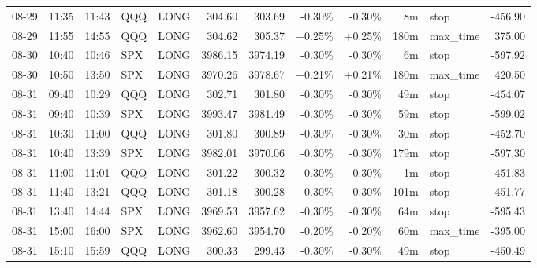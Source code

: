 \documentclass[11pt,a4paper]{article}
\begin{document}
\begin{center}
\begin{longtable}{>{\color{txtmain}}l l l l l r r r r r >{\color{txtmain}}l r}
08-29 & 11:35 & 11:43 & QQQ & LONG & 304.60 & 303.69 & \textcolor{lossred}{-0.30\%} & \textcolor{lossred}{-0.30\%} & 8m & stop & \textcolor{lossred}{-456.90} \\
08-29 & 11:55 & 14:55 & QQQ & LONG & 304.62 & 305.37 & \textcolor{wingreen}{+0.25\%} & \textcolor{wingreen}{+0.25\%} & 180m & max\_time & \textcolor{wingreen}{375.00} \\
08-30 & 10:40 & 10:46 & SPX & LONG & 3986.15 & 3974.19 & \textcolor{lossred}{-0.30\%} & \textcolor{lossred}{-0.30\%} & 6m & stop & \textcolor{lossred}{-597.92} \\
08-30 & 10:50 & 13:50 & SPX & LONG & 3970.26 & 3978.67 & \textcolor{wingreen}{+0.21\%} & \textcolor{wingreen}{+0.21\%} & 180m & max\_time & \textcolor{wingreen}{420.50} \\
08-31 & 09:40 & 10:29 & QQQ & LONG & 302.71 & 301.80 & \textcolor{lossred}{-0.30\%} & \textcolor{lossred}{-0.30\%} & 49m & stop & \textcolor{lossred}{-454.07} \\
08-31 & 09:40 & 10:39 & SPX & LONG & 3993.47 & 3981.49 & \textcolor{lossred}{-0.30\%} & \textcolor{lossred}{-0.30\%} & 59m & stop & \textcolor{lossred}{-599.02} \\
08-31 & 10:30 & 11:00 & QQQ & LONG & 301.80 & 300.89 & \textcolor{lossred}{-0.30\%} & \textcolor{lossred}{-0.30\%} & 30m & stop & \textcolor{lossred}{-452.70} \\
08-31 & 10:40 & 13:39 & SPX & LONG & 3982.01 & 3970.06 & \textcolor{lossred}{-0.30\%} & \textcolor{lossred}{-0.30\%} & 179m & stop & \textcolor{lossred}{-597.30} \\
08-31 & 11:00 & 11:01 & QQQ & LONG & 301.22 & 300.32 & \textcolor{lossred}{-0.30\%} & \textcolor{lossred}{-0.30\%} & 1m & stop & \textcolor{lossred}{-451.83} \\
08-31 & 11:40 & 13:21 & QQQ & LONG & 301.18 & 300.28 & \textcolor{lossred}{-0.30\%} & \textcolor{lossred}{-0.30\%} & 101m & stop & \textcolor{lossred}{-451.77} \\
08-31 & 13:40 & 14:44 & SPX & LONG & 3969.53 & 3957.62 & \textcolor{lossred}{-0.30\%} & \textcolor{lossred}{-0.30\%} & 64m & stop & \textcolor{lossred}{-595.43} \\
08-31 & 15:00 & 16:00 & SPX & LONG & 3962.60 & 3954.70 & \textcolor{lossred}{-0.20\%} & \textcolor{lossred}{-0.20\%} & 60m & max\_time & \textcolor{lossred}{-395.00} \\
08-31 & 15:10 & 15:59 & QQQ & LONG & 300.33 & 299.43 & \textcolor{lossred}{-0.30\%} & \textcolor{lossred}{-0.30\%} & 49m & stop & \textcolor{lossred}{-450.49} \\

\end{longtable}
\end{center}
\end{document}
